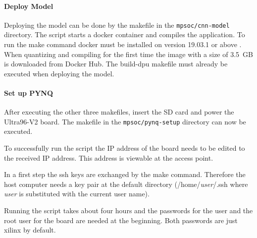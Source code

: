 \paragraph{Deploy Model}
Deploying the model can be done by the makefile in the \texttt{mpsoc/cnn-model} directory.
The script starts a docker container and compiles the application.
To run the make command docker must be installed on version 19.03.1 or above \cite{vitis_ai_user_guide}.
When quantizing and compiling for the first time the image with a size of \SI{3.5}{GB} is downloaded from Docker Hub.
The build-dpu makefile must already be executed when deploying the model.

\paragraph{Set up PYNQ}
After executing the other three makefiles, insert the SD card and power the Ultra96-V2 board.
The makefile in the \texttt{mpsoc/pynq-setup} directory can now be executed.

To successfully run the script the IP address of the board needs to be edited to the received IP address.
This address is viewable at the access point.

In a first step the \acrshort{ssh} keys are exchanged by the make command.
Therefore the host computer needs a key pair at the default directory (/home/\textit{user}/.ssh where \textit{user} is substituted with the current user name).

Running the script takes about four hours and the passwords for the user and the root user for the board are needed at the beginning.
Both passwords are just xilinx by default.
